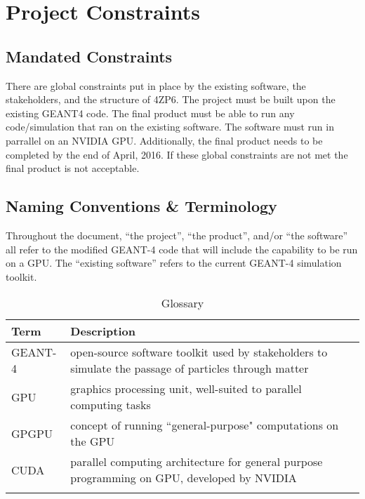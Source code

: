 \documentclass[12pt]{article}
\begin{document}
\section{Project Constraints}

\subsection{Mandated Constraints} %
There are global constraints put in place by the existing software, the stakeholders, and the structure of 4ZP6. The project must be built upon the existing GEANT4 code. The final product must be able to run any code/simulation that ran on the existing software. The software must run in parrallel on an NVIDIA GPU. Additionally, the final product needs to be completed by the end of April, 2016. If these global constraints are not met the final product is not acceptable.\\

\subsection{Naming Conventions \& Terminology} %
Throughout the document, ``the project'', ``the product'', and/or ``the software'' all refer to the modified GEANT-4 code that will include the capability to be run on a GPU. The ``existing software'' refers to the current GEANT-4 simulation toolkit.\\
\begin{table}[h]
\centering
\caption{Glossary}
\begin{tabularx}{\textwidth}{l|X}
\Xhline{2\arrayrulewidth}
\bf Term & \bf Description\\
\hline
GEANT-4 & open-source software toolkit used by stakeholders to simulate the passage of particles through matter\\
GPU & graphics processing unit, well-suited to parallel computing tasks\\
GPGPU & concept of running ``general-purpose" computations on the GPU\\
CUDA & parallel computing architecture for general purpose programming on GPU, developed by NVIDIA\\
\Xhline{2\arrayrulewidth}
\end{tabularx}
\end{table}
\end{document}
